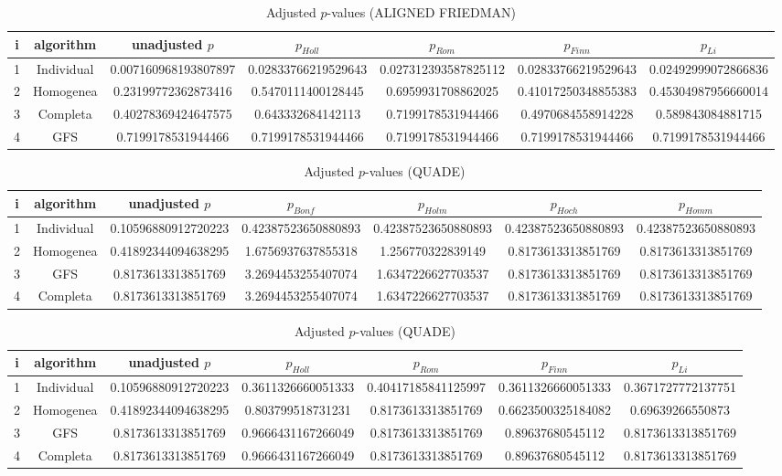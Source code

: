 \documentclass[a4paper,10pt]{article}
\begin{document}
\begin{landscape}
\begin{table}[!htp]
\centering\scriptsize
\caption{Adjusted $p$-values (ALIGNED FRIEDMAN)}
\begin{tabular}{ccccccc}
i&algorithm&unadjusted $p$&$p_{Holl}$&$p_{Rom}$&$p_{Finn}$&$p_{Li}$\\
\hline
1&Individual&0.007160968193807897&0.02833766219529643&0.027312393587825112&0.02833766219529643&0.02492999072866836\\
2&Homogenea&0.23199772362873416&0.5470111400128445&0.6959931708862025&0.41017250348855383&0.45304987956660014\\
3&Completa&0.40278369424647575&0.643332684142113&0.7199178531944466&0.4970684558914228&0.589843084881715\\
4&GFS&0.7199178531944466&0.7199178531944466&0.7199178531944466&0.7199178531944466&0.7199178531944466\\
\hline
\end{tabular}
\end{table}


\newpage

\begin{table}[!htp]
\centering\scriptsize
\caption{Adjusted $p$-values (QUADE)}
\begin{tabular}{ccccccc}
i&algorithm&unadjusted $p$&$p_{Bonf}$&$p_{Holm}$&$p_{Hoch}$&$p_{Homm}$\\
\hline
1&Individual&0.10596880912720223&0.42387523650880893&0.42387523650880893&0.42387523650880893&0.42387523650880893\\
2&Homogenea&0.41892344094638295&1.6756937637855318&1.256770322839149&0.8173613313851769&0.8173613313851769\\
3&GFS&0.8173613313851769&3.2694453255407074&1.6347226627703537&0.8173613313851769&0.8173613313851769\\
4&Completa&0.8173613313851769&3.2694453255407074&1.6347226627703537&0.8173613313851769&0.8173613313851769\\
\hline
\end{tabular}
\end{table}

\begin{table}[!htp]
\centering\scriptsize
\caption{Adjusted $p$-values (QUADE)}
\begin{tabular}{ccccccc}
i&algorithm&unadjusted $p$&$p_{Holl}$&$p_{Rom}$&$p_{Finn}$&$p_{Li}$\\
\hline
1&Individual&0.10596880912720223&0.3611326660051333&0.40417185841125997&0.3611326660051333&0.3671727772137751\\
2&Homogenea&0.41892344094638295&0.803799518731231&0.8173613313851769&0.6623500325184082&0.69639266550873\\
3&GFS&0.8173613313851769&0.9666431167266049&0.8173613313851769&0.89637680545112&0.8173613313851769\\
4&Completa&0.8173613313851769&0.9666431167266049&0.8173613313851769&0.89637680545112&0.8173613313851769\\
\hline
\end{tabular}
\end{table}

\end{landscape}
\end{document}

